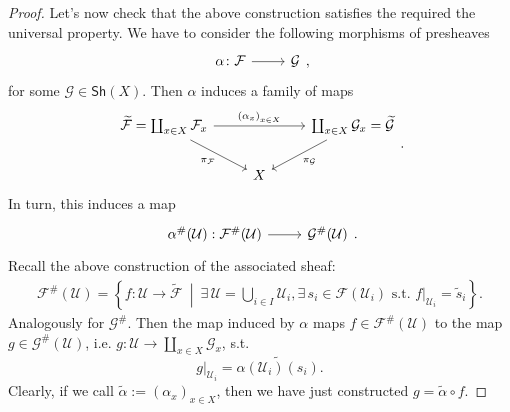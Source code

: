 \documentclass[../Main]{subfiles}
\begin{document}
\begin{proof}
Let's now check that the above construction satisfies the required the universal property.
We have to consider the following morphisms of presheaves
\begin{equation}
	\begin{tikzcd}
		\alpha\colon \mathcal{F} \arrow[r, "", rightarrow] &
\mathcal{G}
	\end{tikzcd}
,\end{equation} 
for some $\mathcal{G} \in \mathsf{Sh}\left(X\right)$.
Then $\alpha$ induces a family of maps 
\begin{equation}
\begin{tikzcd}
	\widetilde{\mathcal{F}} = \coprod_{x \in X} \mathcal{F}_x
	\arrow[rr, "\left( \alpha_x \right)_{x \in X}", rightarrow] 
	\arrow[rd, "\pi_{\mathcal{F}}"', rightarrow] & &
	\coprod_{x \in X} \mathcal{G}_x = \widetilde{\mathcal{G}} 
	\arrow[ld, "\pi_{\mathcal{G}}", rightarrow] \\
	&
	X
\end{tikzcd}
.\end{equation} 
In turn, this induces a map
\begin{equation}
	\begin{tikzcd}
	\alpha^\#(\mathcal{U}): \mathcal{F}^\#(\mathcal{U}) \arrow[r, "", rightarrow] &
	\mathcal{G}^\#(\mathcal{U})
	\end{tikzcd}
.\end{equation} 
Recall the above construction of the associated sheaf:
\begin{align}
	\mathcal{F}^\#(\mathcal{U}) = \left\{ 
	f\colon \mathcal{U} \to \widetilde{\mathcal{F}} \ \middle|\ 
	\exists\, \mathcal{U} = \bigcup_{i \in I} \mathcal{U}_i,
	\exists\, s_i \in \mathcal{F}(\mathcal{U}_i) \text{ s.t. } \left.f\right|_{\mathcal{U}_i} = \tilde{s}_i\right\}
.\end{align} 
Analogously for $\mathcal{G}^\#$.
Then the map induced by $\alpha$
maps $f \in \mathcal{F}^\#(\mathcal{U})$
to the map $g \in \mathcal{G}^\#(\mathcal{U})$,
i.e. $g\colon \mathcal{U} \to \coprod_{x \in X} \mathcal{G}_x$, s.t.
\begin{equation}
	\left.g\right|_{\mathcal{U}_i} = \widetilde{\alpha(\mathcal{U}_i)(s_i)}
.\end{equation} 
Clearly, if we call $\tilde{\alpha} := \left( \alpha_x \right)_{x \in X}$, then
we have just constructed $g = \tilde{\alpha} \circ f$.


\end{proof}
\end{document}
